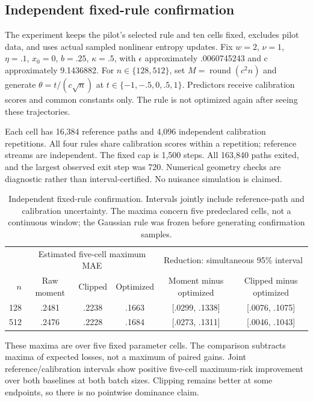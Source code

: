 \subsection{Independent fixed-rule confirmation}\label{independent-fixed-rule-confirmation}

The experiment keeps the pilot's selected rule and ten cells fixed, excludes pilot data, and uses actual sampled nonlinear entropy updates. Fix \(w=2\), \(\nu=1\), \(\eta=.1\), \(x_0=0\), \(b=.25\), \(\kappa=.5\), with \(\epsilon\) approximately .0060745243 and c approximately 9.1436882. For \(n\in\{128,512\}\), set \(M=\operatorname{round}(c^2n)\) and generate \(\theta=t/(c\sqrt n)\) at \(t\in\{-1,-.5,0,.5,1\}\). Predictors receive calibration scores and common constants only. The rule is not optimized again after seeing these trajectories.

Each cell has 16,384 reference paths and 4,096 independent calibration repetitions. All four rules share calibration scores within a repetition; reference streams are independent. The fixed cap is 1,500 steps. All 163,840 paths exited, and the largest observed exit step was 720. Numerical geometry checks are diagnostic rather than interval-certified. No nuisance simulation is claimed.

{\def\LTcaptype{none} %
\begin{table}[t]
\centering\small
\begin{tabular}{rccc cc}
\toprule
& \multicolumn{3}{c}{Estimated five-cell maximum MAE} & \multicolumn{2}{c}{Reduction: simultaneous 95\% interval} \\
$n$ & Raw moment & Clipped & Optimized & Moment minus optimized & Clipped minus optimized \\
\midrule
128 & .2481 & .2238 & .1663 & [.0299, .1338] & [.0076, .1075] \\
512 & .2476 & .2228 & .1684 & [.0273, .1311] & [.0046, .1043] \\
\bottomrule
\end{tabular}
\caption{Independent fixed-rule confirmation. Intervals jointly include reference-path and calibration uncertainty. The maxima concern five predeclared cells, not a continuous window; the Gaussian rule was frozen before generating confirmation samples.}\label{tab:confirmation}
\end{table}
}

These maxima are over five fixed parameter cells. The comparison subtracts maxima of expected losses, not a maximum of paired gains. Joint reference/calibration intervals show positive five-cell maximum-risk improvement over both baselines at both batch sizes. Clipping remains better at some endpoints, so there is no pointwise dominance claim.

